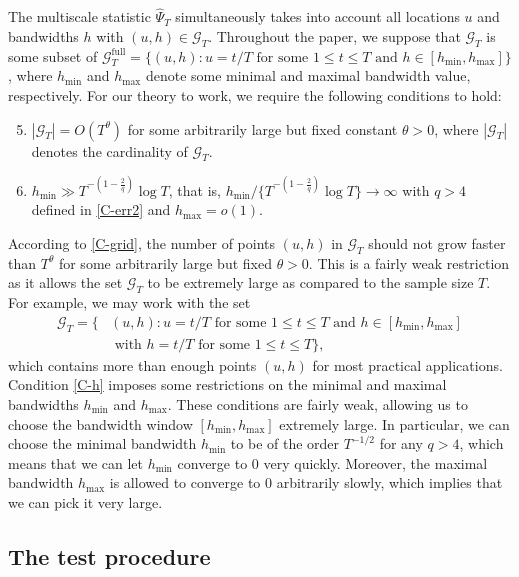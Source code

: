 The multiscale statistic $\widehat{\Psi}_T$ simultaneously takes into account all locations $u$ and bandwidths $h$ with $(u,h) \in \mathcal{G}_T$. Throughout the paper, we suppose that $\mathcal{G}_T$ is some subset of $\mathcal{G}_T^{\text{full}} = \{ (u,h): u = t/T \text{ for some } 1 \le t \le T \text{ and } h \in [h_{\min},h_{\max}] \}$, where $h_{\min}$ and $h_{\max}$ denote some minimal and maximal bandwidth value, respectively. For our theory to work, we require the following conditions to hold:
\begin{enumerate}[label=(C\arabic*),leftmargin=1.05cm]
\setcounter{enumi}{4}

\item \label{C-grid} $|\mathcal{G}_T| = O(T^\theta)$ for some arbitrarily large but fixed constant $\theta > 0$, where $|\mathcal{G}_T|$ denotes the cardinality of $\mathcal{G}_T$. 

\item \label{C-h} $h_{\min} \gg T^{-(1-\frac{2}{q})} \log T$, that is, $h_{\min} / \{ T^{-(1-\frac{2}{q})} \log T \} \rightarrow \infty$ with $q > 4$ defined in \ref{C-err2} and $h_{\max} = o(1)$.

\end{enumerate}
According to \ref{C-grid}, the number of points $(u,h)$ in $\mathcal{G}_T$ should not grow faster than $T^\theta$ for some arbitrarily large but fixed $\theta > 0$. This is a fairly weak restriction as it allows the set $\mathcal{G}_T$ to be extremely large as compared to the sample size $T$. For example, we may work with the set 
\begin{align*}
\mathcal{G}_T = \big\{ & (u,h): u = t/T \text{ for some } 1 \le t \le T \text{ and } h \in [h_{\min},h_{\max}] \\ & \text{ with } h = t/T \text{ for some } 1 \le t \le T  \big\},
\end{align*}
which contains more than enough points $(u,h)$ for most practical applications. Condition \ref{C-h} imposes some restrictions on the minimal and maximal bandwidths $h_{\min}$ and $h_{\max}$. These conditions are fairly weak, allowing us to choose the bandwidth window $[h_{\min},h_{\max}]$ extremely large. In particular, we can choose the minimal bandwidth $h_{\min}$ to be of the order $T^{-1/2}$ for any $q > 4$, which means that we can let $h_{\min}$ converge to $0$ very quickly. Moreover, the maximal bandwidth $h_{\max}$ is allowed to converge to $0$ arbitrarily slowly, which implies that we can pick it very large.


\subsection{The test procedure}\label{subsec-method-test}


